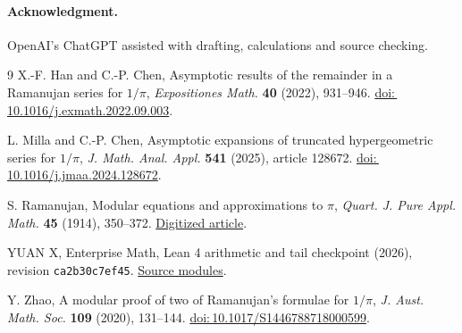\documentclass[11pt,reqno]{amsart}
\newcommand{\ddoi}[1]{\href{https://doi.org/#1}{doi:\,#1}}
\begin{document}
\paragraph{Acknowledgment.}
OpenAI's ChatGPT assisted with drafting, calculations and source checking.

\begin{thebibliography}{9}
X.-F. Han and C.-P. Chen,
Asymptotic results of the remainder in a Ramanujan series for $1/\pi$,
\emph{Expositiones Math.} \textbf{40} (2022), 931--946.
\ddoi{10.1016/j.exmath.2022.09.003}.

L. Milla and C.-P. Chen,
Asymptotic expansions of truncated hypergeometric series for $1/\pi$,
\emph{J. Math. Anal. Appl.} \textbf{541} (2025), article 128672.
\ddoi{10.1016/j.jmaa.2024.128672}.

S. Ramanujan, Modular equations and approximations to $\pi$,
\emph{Quart. J. Pure Appl. Math.} \textbf{45} (1914), 350--372.
\href{https://ramanujan.sirinudi.org/Volumes/published/ram06.pdf}{Digitized article}.

YUAN X, Enterprise Math, Lean 4 arithmetic and tail checkpoint (2026),
revision \texttt{ca2b30c7ef45}.
\href{https://github.com/awdawmip/enterprise-math/tree/ca2b30c7ef45b470d0d5cb6955def48610cd9dd7/EnterpriseMath/PrecisionPi}{Source modules}.

Y. Zhao, A modular proof of two of Ramanujan's formulae for $1/\pi$,
\emph{J. Aust. Math. Soc.} \textbf{109} (2020), 131--144.
\ddoi{10.1017/S1446788718000599}.
\end{thebibliography}
\end{document}
